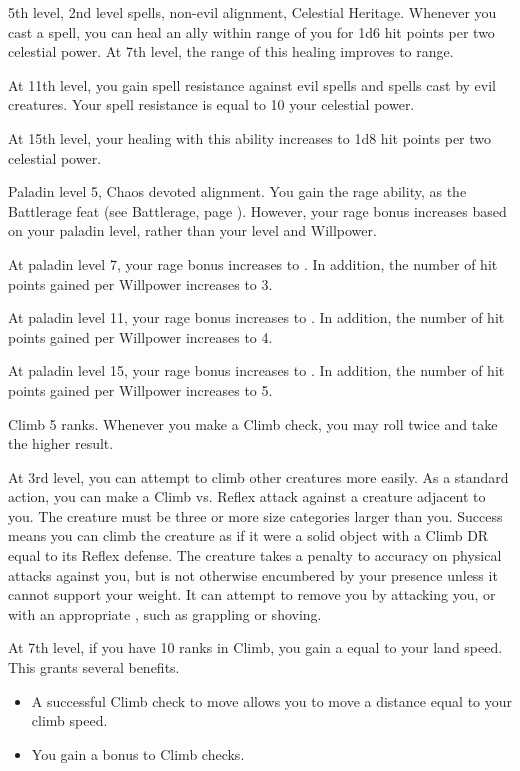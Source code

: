     \featpres 5th level, 2nd level spells, non-evil alignment, Celestial Heritage.
    \featben Whenever you cast a spell, you can heal an ally within \rngclose range of you for 1d6 hit points per two celestial power.
    At 7th level, the range of this healing improves to \rngmed range.

    At 11th level, you gain spell resistance against evil spells and spells cast by evil creatures.
    Your spell resistance is equal to 10 \add your celestial power.

    At 15th level, your healing with this ability increases to 1d8 hit points per two celestial power.

    \featpres Paladin level 5, Chaos devoted alignment.
    \featben You gain the rage ability, as the Battlerage feat (see Battlerage, page ).
    However, your rage bonus increases based on your paladin level, rather than your level and Willpower.

    At paladin level 7, your rage bonus increases to .
    In addition, the number of hit points gained per Willpower increases to 3.

    At paladin level 11, your rage bonus increases to .
    In addition, the number of hit points gained per Willpower increases to 4.

    At paladin level 15, your rage bonus increases to .
    In addition, the number of hit points gained per Willpower increases to 5.

    \featpre Climb 5 ranks.
    \featben Whenever you make a Climb check, you may roll twice and take the higher result.

    At 3rd level, you can attempt to climb other creatures more easily.
    As a standard action, you can make a Climb vs. Reflex attack against a creature adjacent to you.
    The creature must be three or more size categories larger than you.
    Success means you can climb the creature as if it were a solid object with a Climb DR equal to its Reflex defense.
    The creature takes a  penalty to accuracy on physical attacks against you, but is not otherwise encumbered by your presence unless it cannot support your weight.
    It can attempt to remove you by attacking you, or with an appropriate , such as grappling or shoving.

    At 7th level, if you have 10 ranks in Climb, you gain a  equal to your land speed.
    This grants several benefits.
    \begin{itemize}
        \item A successful Climb check to move allows you to move a distance equal to your climb speed.
        \item You gain a  bonus to Climb checks.
    \end{itemize}

